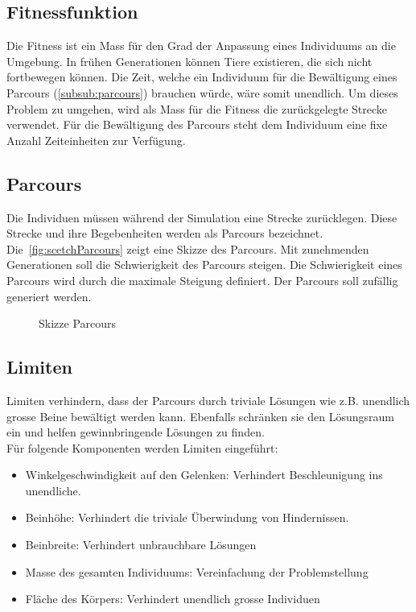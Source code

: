     \subsection{Fitnessfunktion}

      Die Fitness ist ein Mass für den Grad der Anpassung eines Individuums an die Umgebung.
      In frühen Generationen können Tiere existieren, die sich nicht fortbewegen können.
      Die Zeit, welche ein Individuum für die Bewältigung eines Parcours (\vref{subsub:parcours}) brauchen würde,
      wäre somit unendlich.
      Um dieses Problem zu umgehen, wird als Mass für die Fitness die zurückgelegte Strecke verwendet.
      Für die Bewältigung des Parcours steht dem Individuum eine fixe Anzahl Zeiteinheiten zur Verfügung.

    \subsection{Parcours\label{subsub:parcours}}

      Die Individuen müssen während der Simulation eine Strecke zurücklegen.
      Diese Strecke und ihre Begebenheiten werden als Parcours bezeichnet.
      Die~\vref{fig:scetchParcours} zeigt eine Skizze des Parcours.
      Mit zunehmenden Generationen soll die Schwierigkeit des Parcours steigen.
      Die Schwierigkeit eines Parcours wird durch die maximale Steigung definiert.
      Der Parcours soll zufällig generiert werden.

      \begin{figure}[H]
        
        \caption{Skizze Parcours\label{fig:scetchParcours}}
      \end{figure}

    \subsection{Limiten\label{sub:IntroReqLimit}}

      Limiten verhindern, dass der Parcours durch triviale Lösungen wie z.B. unendlich grosse Beine bewältigt werden kann.
      Ebenfalls schränken sie den Lösungsraum ein und helfen gewinnbringende Lösungen zu finden.
      \\
      Für folgende Komponenten werden Limiten eingeführt:

      \begin{itemize}
        \item Winkelgeschwindigkeit auf den Gelenken: Verhindert Beschleunigung ins unendliche.
        \item Beinhöhe: Verhindert die triviale Überwindung von Hindernissen.
        \item Beinbreite: Verhindert unbrauchbare Lösungen
        \item Masse des gesamten Individuums: Vereinfachung der Problemstellung
        \item Fläche des Körpers: Verhindert unendlich grosse Individuen
      \end{itemize}
